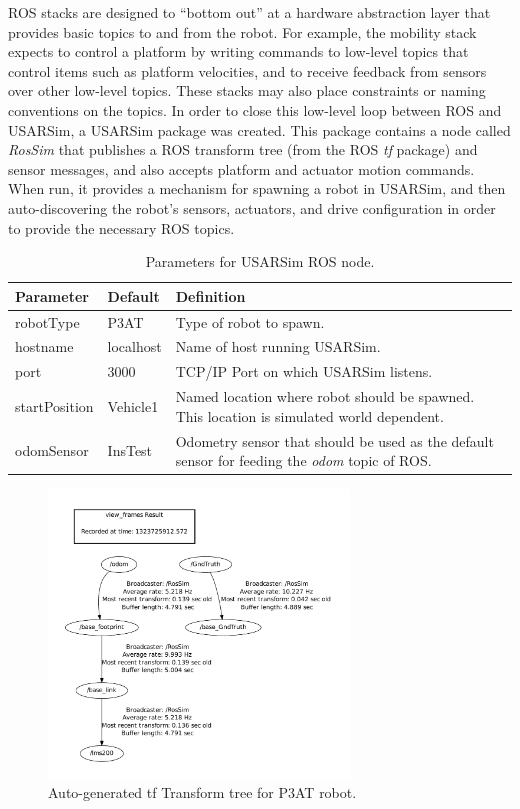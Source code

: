 ROS stacks are designed to ``bottom out'' at a hardware abstraction layer that provides basic topics to and from the robot. For example, the mobility stack expects to control a platform by writing commands to low-level topics that control items such as platform velocities, and to receive feedback from sensors over other low-level topics. These stacks may also place constraints or naming conventions on the topics.  In order to close this low-level loop between ROS and USARSim, a USARSim package was created. This package contains a node called {\it RosSim} that publishes a ROS transform tree (from the ROS {\it tf} package) and sensor messages, and also accepts platform and actuator motion commands. When run, it provides a mechanism for spawning a robot in USARSim, and then auto-discovering the robot's sensors, actuators, and drive configuration in order to provide the necessary ROS topics. 
 \begin{table}[t!]
    \begin{center}
    \small{
    \begin{tabular}{ | l | l | p{4cm} |}
    \hline
    Parameter & Default & Definition \\ \hline
   robotType & P3AT & Type of robot to spawn. \\ \hline
   hostname & localhost & Name of host running USARSim. \\ \hline
   port & 3000 & TCP/IP Port on which USARSim listens. \\ \hline
   startPosition & Vehicle1 & Named location where robot should be spawned. This location is simulated world dependent. \\ \hline
   odomSensor & InsTest & Odometry sensor that should be used as the default sensor for feeding the {\it odom} topic of ROS.\\ \hline
    \end{tabular}
   }
    \caption{Parameters for USARSim ROS node.}
    \label{Table:USARSimNode}
    \end{center}
\end{table}
\begin{figure}[t!]
\centering
\includegraphics[width=8cm]{Figures/ROS/P3ATFrames.pdf}
\caption{Auto-generated tf Transform tree for P3AT robot.}
\label{Fig:P3ATTransformTree}
\end{figure}

